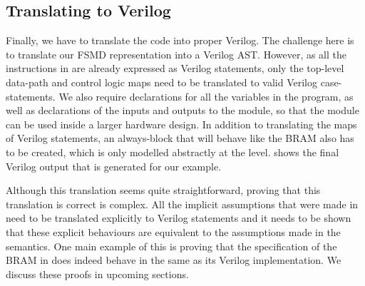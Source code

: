 \subsection{Translating \htl{} to Verilog}

Finally, we have to translate the \htl{} code into proper
Verilog. %
The challenge here is to translate our FSMD representation into a Verilog AST.
However, as all the instructions in \htl{} are already expressed as Verilog
statements, only the top-level data-path and control logic maps need to be
translated to valid Verilog case-statements.  We also require declarations for
all the variables in the program, as well as declarations of the inputs and
outputs to the module, so that the module can be used inside a larger hardware
design.  In addition to translating the maps of Verilog statements, an
always-block that will behave like the \gls{BRAM} also has to be created, which
is only modelled abstractly at the \htl{} level.   shows
the final Verilog output that is generated for our example.

Although this translation seems quite straight\-forward, proving that this
translation is correct is complex.  All the implicit assumptions that were made
in \htl{} need to be translated explicitly to Verilog statements and it needs to
be shown that these explicit behaviours are equivalent to the assumptions made
in the \htl{} semantics.  One main example of this is proving that the
specification of the \gls{BRAM} in \htl{} does indeed behave in the same as its
Verilog implementation.  We discuss these proofs in upcoming sections.


